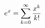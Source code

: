 \documentclass[preview]{standalone}
\begin{document}
\begin{align*}
e^x = \sum_{k=0}^{\infty} {x^k \over k!}
\end{align*}
\end{document}
